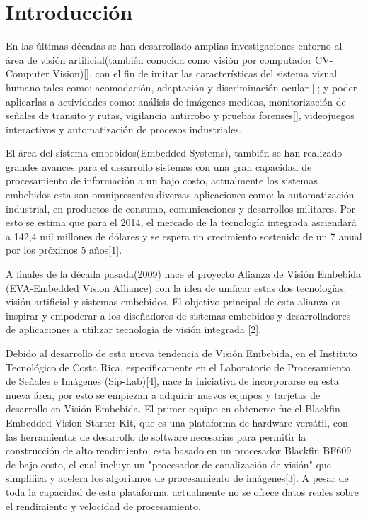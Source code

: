 
\chapter{Introducción}
\label{chp:intro}

En las últimas décadas se han desarrollado amplias investigaciones entorno al área de visión artificial(también conocida como visión por computador CV-Computer Vision)[], con el fin de imitar las características del sistema visual humano tales como: acomodación, adaptación y discriminación ocular []; y poder aplicarlas a actividades como: análisis de imágenes medicas, monitorización de señales de transito y rutas, vigilancia antirrobo y pruebas forenses[], videojuegos interactivos y automatización de procesos industriales. 

El área del sistema embebidos(Embedded Systems), también se han realizado grandes avances para el desarrollo sistemas con una gran capacidad de procesamiento de información a un bajo costo, actualmente los sistemas embebidos esta son omnipresentes diversas aplicaciones como: la automatización industrial, en productos de consumo, comunicaciones y desarrollos militares. Por esto se estima que para el 2014, el mercado de la tecnología integrada asciendará a 142,4 mil millones de dólares y se espera un crecimiento sostenido de un 7 anual por los próximos 5 años[1].



A finales de la década pasada(2009) nace el proyecto Alianza de Visión Embebida (EVA-Embedded Vision Alliance) con la idea de unificar estas dos tecnologías: visión artificial y sistemas embebidos. El objetivo principal de esta alianza es inspirar y empoderar a los diseñadores de sistemas embebidos y desarrolladores de aplicaciones a utilizar tecnología de visión integrada [2]. 

Debido al desarrollo de esta nueva tendencia de Visión Embebida, en el Instituto Tecnológico de Costa Rica, específicamente en el Laboratorio de Procesamiento de Señales e Imágenes (Sip-Lab)[4], nace la iniciativa de incorporarse en esta nueva área, por esto se empiezan a adquirir nuevos equipos y tarjetas de desarrollo en Visión Embebida. El primer equipo en obtenerse fue el Blackfin Embedded Vision Starter Kit, que es una plataforma de hardware versátil, con las herramientas de desarrollo de software necesarias para permitir la construcción de alto rendimiento; esta basado en un procesador Blackfin BF609 de bajo costo, el cual incluye un "procesador de canalización de visión" que simplifica y acelera los algoritmos de procesamiento de imágenes[3]. A pesar de toda la capacidad de esta plataforma, actualmente no se ofrece datos reales sobre el rendimiento y velocidad de procesamiento.

